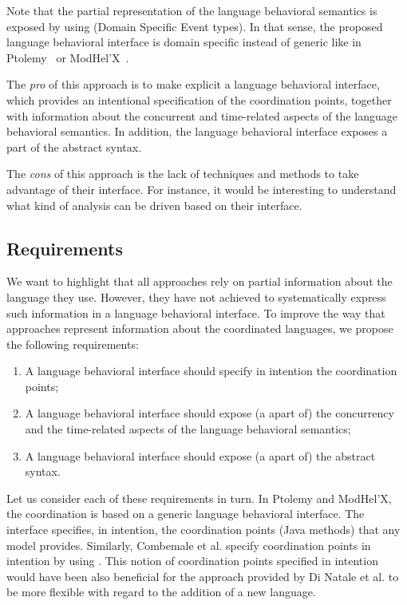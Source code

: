 {Note that the partial representation of the language behavioral semantics is exposed by using \dse (Domain Specific Event types). In that sense, the proposed language behavioral interface is domain specific instead of generic like in Ptolemy~\cite{ptoleframebib} or ModHel'X~\cite{modhelxbib}. 

The \emph{pro} of this approach is to make explicit a language behavioral interface, which provides an intentional specification of the coordination points, together with information about the concurrent and time-related aspects of the language behavioral semantics. In addition, the language behavioral interface exposes a part of the abstract syntax.   

The \emph{cons} of this approach is the lack of techniques and methods to take advantage of their interface. For instance, it would be interesting to understand what kind of analysis can be driven based on their interface.


\subsection{Requirements}
We want to highlight that all approaches rely on partial information about the language they use. However, they have not achieved to systematically express such information in a language behavioral interface. To improve the way that approaches represent information about the coordinated languages, we propose the following requirements: 

\begin{enumerate}
	\item A language behavioral interface should specify in intention the coordination points;
	\item A language behavioral interface should expose (a apart of) the concurrency and the time-related aspects of the language behavioral semantics;
	\item A language behavioral interface should expose (a apart of) the abstract syntax.
\end{enumerate}
    
Let us consider each of these requirements in turn. In Ptolemy and ModHel'X, the coordination is based on a generic language behavioral interface. The interface specifies, in intention, the coordination points (\ie Java methods) that any model provides. Similarly, Combemale et al. specify coordination points in intention by using \dse. This notion of coordination points specified in intention would have been also beneficial for the approach provided by Di Natale et al. to be more flexible with regard to the addition of a new language.

}
